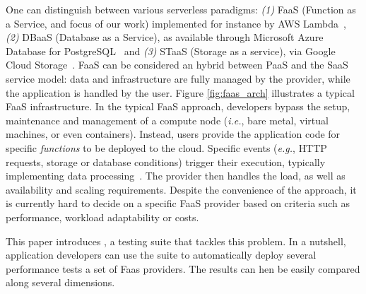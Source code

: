 One can distinguish between various serverless paradigms: \emph{(1)} FaaS (Function as a Service, and focus of our work) implemented for instance by \gls{AWS} Lambda~\cite{AWSLambda}, \emph{(2)} DBaaS (Database as a Service), as available through Microsoft Azure Database for PostgreSQL~\cite{AzureDBaaS} and \emph{(3)} STaaS (Storage as a service), via Google Cloud Storage~\cite{serverlessgoogle}. 
FaaS can be considered an hybrid between \gls{PaaS} and the \gls{SaaS} service model: data and infrastructure are fully managed by the provider, while the application is handled by the user.
Figure \ref{fig:faas_arch} illustrates a typical FaaS infrastructure.
In the typical FaaS approach, developers bypass the setup, maintenance and management of a compute node (\emph{i.e.}, bare metal, virtual machines, or even containers). %
Instead, users provide the application code for specific \emph{functions} to be deployed to the cloud.
Specific events (\emph{e.g.}, \gls{HTTP} requests, storage or database conditions) trigger their execution, typically implementing data processing~\cite{AWSLambda, GoogleFunctions}.
The provider then handles the load, as well as availability and scaling requirements. %
Despite the convenience of the approach, it is currently hard to decide on a specific FaaS provider based on criteria such as performance, workload adaptability or costs.

This paper introduces \sys, a testing suite that tackles this problem.
In a nutshell, application developers can use the \sys suite to automatically deploy several performance tests a set of Faas providers. 
The results can hen be easily compared along several dimensions.

